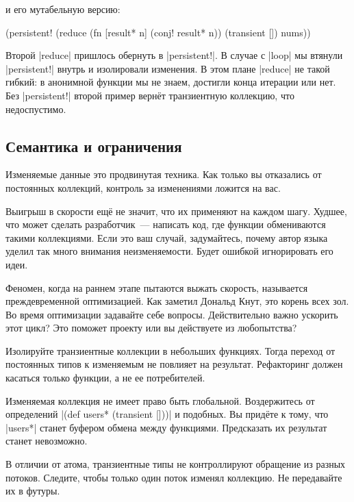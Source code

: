 \noindent
и его мутабельную версию:

\begin{english}
  \begin{clojure}
(persistent!
 (reduce
  (fn [result* n]
    (conj! result* n))
  (transient [])
  nums))
  \end{clojure}
\end{english}

Второй \spverb|reduce| пришлось обернуть в \spverb|persistent!|. В случае с
\spverb|loop| мы втянули \spverb|persistent!| внутрь и изолировали изменения. В
этом плане \spverb|reduce| не такой гибкий: в анонимной функции мы не знаем,
достигли конца итерации или нет. Без \spverb|persistent!| второй пример верн\"{е}т
транзиентную коллекцию, что недоспустимо.

\subsection{Семантика и ограничения}

Изменяемые данные это продвинутая техника. Как только вы отказались от
постоянных коллекций, контроль за изменениями ложится на вас.

Выигрыш в скорости ещ\"{е} не значит, что их применяют на каждом шагу. Худшее, что
может сделать разработчик~--- написать код, где функции обмениваются такими
коллекциями. Если это ваш случай, задумайтесь, почему автор языка уделил так
много внимания неизменяемости. Будет ошибкой игнорировать его идеи.

Феномен, когда на раннем этапе пытаются выжать скорость, называется
преждевременной оптимизацией. Как заметил Дональд Кнут, это корень всех зол. Во
время оптимизации задавайте себе вопросы. Действительно важно ускорить этот
цикл? Это поможет проекту или вы действуете из любопытства?

Изолируйте транзиентные коллекции в небольших функциях. Тогда переход от
постоянных типов к изменяемым не повлияет на результат. Рефакторинг должен
касаться только функции, а не ее потребителей.

Изменяемая коллекция не имеет право быть глобальной. Воздержитесь от определений
\spverb|(def users* (transient []))| и подобных. Вы прид\"{е}те к тому, что
\spverb|users*| станет буфером обмена между функциями. Предсказать их результат
станет невозможно.

В отличии от атома, транзиентные типы не контроллируют обращение из разных
потоков. Следите, чтобы только один поток изменял коллекцию. Не передавайте их в
футуры.

